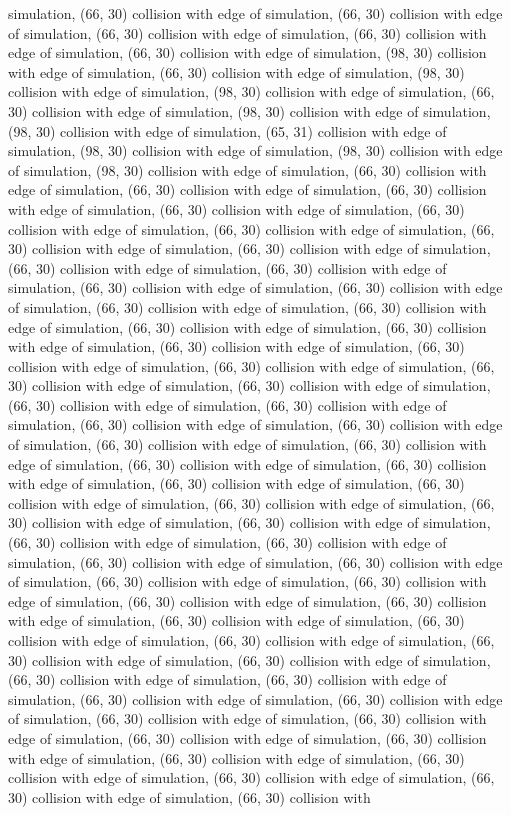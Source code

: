 simulation, (66, 30) collision with edge of simulation, (66, 30) collision with edge of simulation, (66, 30) collision with edge of simulation, (66, 30) collision with edge of simulation, (66, 30) collision with edge of simulation, (98, 30) collision with edge of simulation, (66, 30) collision with edge of simulation, (98, 30) collision with edge of simulation, (98, 30) collision with edge of simulation, (66, 30) collision with edge of simulation, (98, 30) collision with edge of simulation, (98, 30) collision with edge of simulation, (65, 31) collision with edge of simulation, (98, 30) collision with edge of simulation, (98, 30) collision with edge of simulation, (98, 30) collision with edge of simulation, (66, 30) collision with edge of simulation, (66, 30) collision with edge of simulation, (66, 30) collision with edge of simulation, (66, 30) collision with edge of simulation, (66, 30) collision with edge of simulation, (66, 30) collision with edge of simulation, (66, 30) collision with edge of simulation, (66, 30) collision with edge of simulation, (66, 30) collision with edge of simulation, (66, 30) collision with edge of simulation, (66, 30) collision with edge of simulation, (66, 30) collision with edge of simulation, (66, 30) collision with edge of simulation, (66, 30) collision with edge of simulation, (66, 30) collision with edge of simulation, (66, 30) collision with edge of simulation, (66, 30) collision with edge of simulation, (66, 30) collision with edge of simulation, (66, 30) collision with edge of simulation, (66, 30) collision with edge of simulation, (66, 30) collision with edge of simulation, (66, 30) collision with edge of simulation, (66, 30) collision with edge of simulation, (66, 30) collision with edge of simulation, (66, 30) collision with edge of simulation, (66, 30) collision with edge of simulation, (66, 30) collision with edge of simulation, (66, 30) collision with edge of simulation, (66, 30) collision with edge of simulation, (66, 30) collision with edge of simulation, (66, 30) collision with edge of simulation, (66, 30) collision with edge of simulation, (66, 30) collision with edge of simulation, (66, 30) collision with edge of simulation, (66, 30) collision with edge of simulation, (66, 30) collision with edge of simulation, (66, 30) collision with edge of simulation, (66, 30) collision with edge of simulation, (66, 30) collision with edge of simulation, (66, 30) collision with edge of simulation, (66, 30) collision with edge of simulation, (66, 30) collision with edge of simulation, (66, 30) collision with edge of simulation, (66, 30) collision with edge of simulation, (66, 30) collision with edge of simulation, (66, 30) collision with edge of simulation, (66, 30) collision with edge of simulation, (66, 30) collision with edge of simulation, (66, 30) collision with edge of simulation, (66, 30) collision with edge of simulation, (66, 30) collision with edge of simulation, (66, 30) collision with edge of simulation, (66, 30) collision with edge of simulation, (66, 30) collision with edge of simulation, (66, 30) collision with edge of simulation, (66, 30) collision with edge of simulation, (66, 30) collision with edge of simulation, (66, 30) collision with edge of simulation, (66, 30) collision with edge of simulation, (66, 30) collision with 